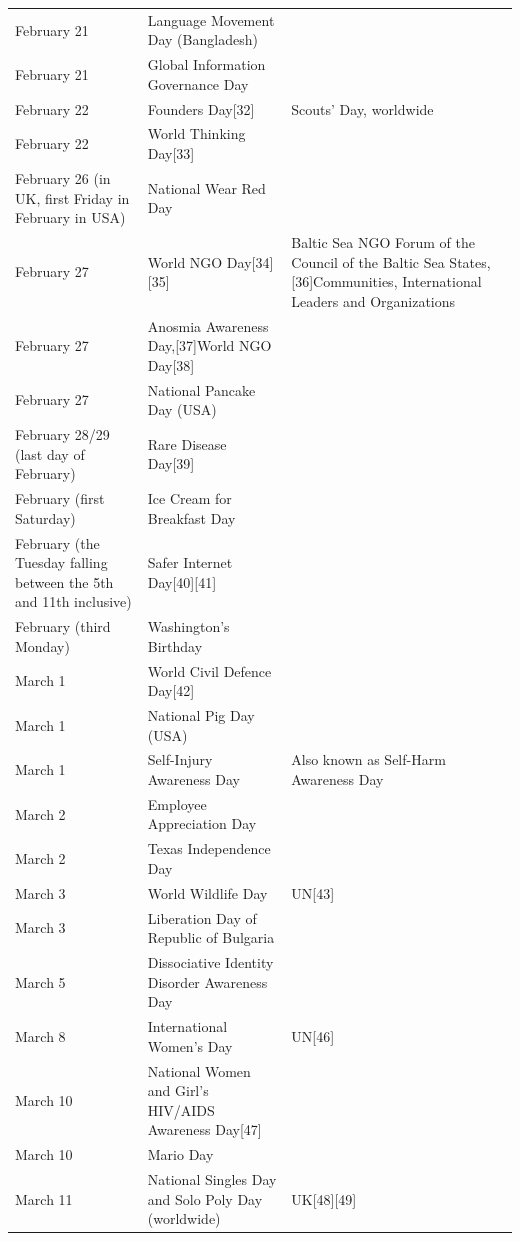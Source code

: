 \documentclass[
  openany]{book}
\begin{document}
\begin{longtable}[t]{>{\raggedright\arraybackslash}p{8em}>{\raggedright\arraybackslash}p{20em}>{\raggedright\arraybackslash}p{12em}}
\rowcolor{gray!6}  February 21 & Language Movement Day (Bangladesh) & \\
\addlinespace
February 21 & Global Information Governance Day & \\
\rowcolor{gray!6}  February 22 & Founders Day[32] & Scouts' Day, worldwide\\
February 22 & World Thinking Day[33] & \\
\rowcolor{gray!6}  February 26 (in UK, first Friday in February in USA) & National Wear Red Day & \\
February 27 & World NGO Day[34][35] & Baltic Sea NGO Forum of the Council of the Baltic Sea States,[36]Communities, International Leaders and Organizations\\
\addlinespace
\rowcolor{gray!6}  February 27 & Anosmia Awareness Day,[37]World NGO Day[38] & \\
February 27 & National Pancake Day (USA) & \\
\rowcolor{gray!6}  February 28/29 (last day of February) & Rare Disease Day[39] & \\
February (first Saturday) & Ice Cream for Breakfast Day & \\
\rowcolor{gray!6}  February (the Tuesday falling between the 5th and 11th inclusive) & Safer Internet Day[40][41] & \\
\addlinespace
February (third Monday) & Washington's Birthday & \\
\rowcolor{gray!6}  March 1 & World Civil Defence Day[42] & \\
March 1 & National Pig Day (USA) & \\
\rowcolor{gray!6}  March 1 & Self-Injury Awareness Day & Also known as Self-Harm Awareness Day\\
March 2 & Employee Appreciation Day & \\
\addlinespace
\rowcolor{gray!6}  March 2 & Texas Independence Day & \\
March 3 & World Wildlife Day & UN[43]\\
\rowcolor{gray!6}  March 3 & Liberation Day of Republic of Bulgaria & [44]\\
March 5 & Dissociative Identity Disorder Awareness Day & [45]\\
\rowcolor{gray!6}  March 8 & International Women's Day & UN[46]\\
\addlinespace
March 10 & National Women and Girl's HIV/AIDS Awareness Day[47] & \\
\rowcolor{gray!6}  March 10 & Mario Day & \\
March 11 & National Singles Day and Solo Poly Day (worldwide) & UK[48][49]\\

\end{longtable}
\end{document}
